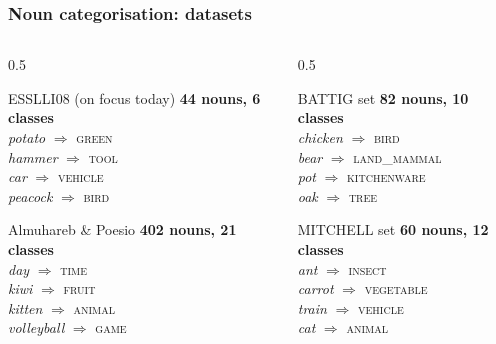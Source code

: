 \documentclass[t]{beamer} %
\begin{document}
\begin{frame}
  \frametitle{Noun categorisation: datasets}

  \ungap[1.5]
  \begin{columns}
    \begin{column}{0.5 \textwidth}
      \begin{exampleblock}{ESSLLI08 (on focus today)}
        \textbf{44 nouns, 6 classes} \\
        \textit{potato} $\Longrightarrow$ \textsc{green}  \\
        \textit{hammer} $\Longrightarrow$ \textsc{tool}  \\
        \textit{car} $\Longrightarrow$ \textsc{vehicle} \\
        \textit{peacock} $\Longrightarrow$ \textsc{bird}     
      \end{exampleblock}
      \begin{exampleblock}{Almuhareb \& Poesio}
        \textbf{402 nouns, 21 classes} \\
        \textit{day} $\Longrightarrow$ \textsc{time}   \\
        \textit{kiwi} $\Longrightarrow$ \textsc{fruit}  \\
        \textit{kitten} $\Longrightarrow$ \textsc{animal} \\
        \textit{volleyball} $\Longrightarrow$ \textsc{game}
      \end{exampleblock}
    \end{column}
    \begin{column}{0.5 \textwidth}
      \begin{exampleblock}{BATTIG set\phantom{p()} }
        \textbf{82 nouns, 10 classes} \\
        \textit{chicken} $\Longrightarrow$ \textsc{bird}   \\
        \textit{bear} $\Longrightarrow$ \textsc{land\_mammal}  \\
        \textit{pot} $\Longrightarrow$ \textsc{kitchenware} \\
        \textit{oak} $\Longrightarrow$ \textsc{tree}\phantom{p} 
      \end{exampleblock}
      \begin{exampleblock}{MITCHELL set \phantom{ \&}}
        \textbf{60 nouns, 12 classes} \\
        \textit{ant} $\Longrightarrow$ \textsc{insect}   \\
        \textit{carrot} $\Longrightarrow$ \textsc{vegetable}  \\
        \textit{train} $\Longrightarrow$ \textsc{vehicle} \\
        \textit{cat} $\Longrightarrow$ \textsc{animal}
      \end{exampleblock}
    \end{column}
  \end{columns}
\end{frame}
\end{document}
